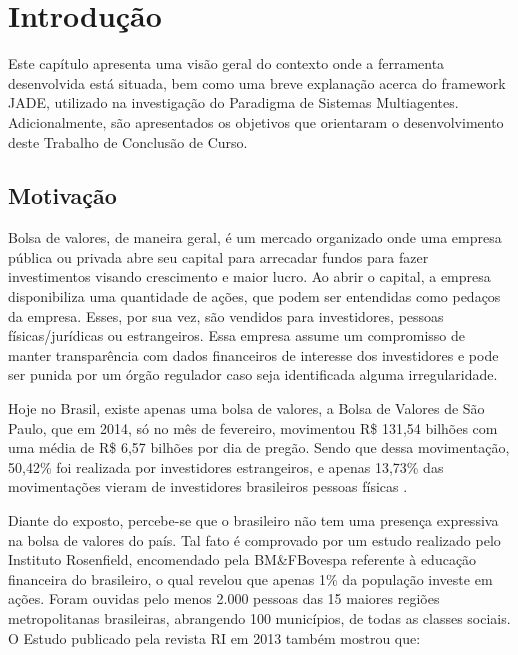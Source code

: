 \chapter[INTRODUÇÃO]{Introdução}

Este capítulo apresenta uma visão geral do contexto onde a ferramenta desenvolvida está situada, bem como uma breve explanação acerca do framework JADE, utilizado na investigação do Paradigma de Sistemas Multiagentes. Adicionalmente, são apresentados os objetivos que orientaram o desenvolvimento deste Trabalho de Conclusão de Curso.

\section{Motivação}


Bolsa de valores, de maneira geral, é um mercado organizado onde uma empresa pública ou privada abre seu capital para arrecadar fundos para fazer investimentos visando crescimento e maior lucro. Ao abrir o capital, a empresa disponibiliza uma quantidade de ações, que podem ser entendidas como pedaços da empresa. Esses, por sua vez, são vendidos para investidores, pessoas físicas/jurídicas ou estrangeiros. Essa empresa assume um compromisso de manter transparência com dados financeiros de interesse dos investidores e pode ser punida por um órgão regulador caso seja identificada alguma irregularidade.

Hoje no Brasil, existe apenas uma bolsa de valores, a Bolsa de Valores de São Paulo, que em 2014, só no mês de fevereiro, movimentou R\$ 131,54 bilhões com uma média de R\$ 6,57 bilhões por dia de pregão. Sendo que dessa movimentação, 50,42\% foi realizada por investidores estrangeiros, e apenas 13,73\% das movimentações vieram de investidores brasileiros pessoas físicas \cite{bovespa2014}.

Diante do exposto, percebe-se que o brasileiro não tem uma presença expressiva na bolsa de valores do país. Tal fato é comprovado por um estudo realizado pelo Instituto Rosenfield, encomendado pela BM\&FBovespa referente à educação financeira do brasileiro, o qual revelou que apenas 1\% da população investe em ações. Foram ouvidas pelo menos 2.000 pessoas das 15 maiores regiões metropolitanas brasileiras, abrangendo 100 municípios, de todas as classes sociais\cite{isabella2013}. O Estudo  publicado pela revista RI em 2013 também mostrou que:

